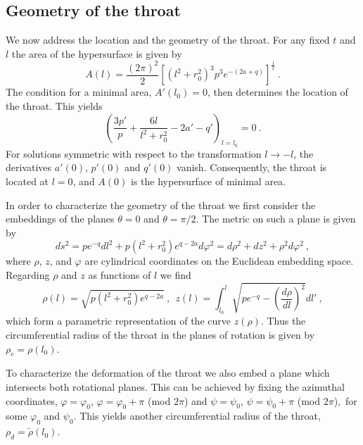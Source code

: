 \documentclass[showpacs,preprintnumbers,amsmath,amssymb,floatfix]{revtex4}
\newcommand{\vphi}{\varphi}
\begin{document}
\subsection{Geometry of the throat}

We now address the location and the geometry of the throat.
For any fixed $t$ and $l$ the area of the hypersurface is given by 
%
\begin{equation}
A(l) = \frac{(2\pi)^2}{2} 
     \left[(l^2+r_0^2)^3 p^3 e^{-(2a+q)}\right]^\frac{1}{2} \ .
\label{surface}
\end{equation}
%
The condition for a minimal area, $A'(l_0)=0$, then determines the location
of the throat. This yields
%
\begin{equation}
\left(\frac{3 p'}{p} + \frac{6l}{l^2+r_0^2} -2a' -q'\right)_{l=l_0} = 0 \ .
\label{cond_min}
\end{equation}
%
For solutions symmetric with respect to the transformation
$l \to -l$, the derivatives $a'(0)$, $p'(0)$ and $q'(0)$ vanish.
Consequently,  the throat is located at $l=0$,
and $A(0)$ is the hypersurface of minimal area.

In order to characterize the geometry of the throat we first
consider the embeddings of the planes %
$\theta=0$ and $\theta=\pi/2$.
The metric on such a plane is given by
%
\begin{equation}
ds^2 = p e^{-q} dl^2 + p(l^2+r_0^2) e^{q-2a}d\vphi^2
= d\rho^2 +dz^2 + \rho^2 d\vphi^2 \ ,
\label{embed1}
\end{equation}
%
where $\rho$, $z$, and $\vphi$ are cylindrical coordinates on the 
Euclidean embedding space. Regarding $\rho$ and $z$ as functions of 
$l$ we find 
%
\begin{equation}
\rho(l) = \sqrt{p(l^2+r_0^2) e^{q-2a}} \ ,  \ \ 
z(l) = \int_{l_0}^l{\sqrt{p e^{-q} - \left(\frac{d\rho}{dl}\right)^2}} dl' \ ,
\label{rho-z1}
\end{equation}
%
which form a parametric representation of the curve $z(\rho)$.
Thus the circumferential radius of the throat in the 
planes of rotation is given by $\rho_c= \rho(l_0)$.

To characterize the deformation of the throat we also
embed a plane which intersects both rotational planes. This can
be achieved by fixing the azimuthal coordinates, 
$\vphi = \vphi_0$, $\vphi = \vphi_0+\pi$ (mod $2\pi$)
and $\psi = \psi_0$, $\psi = \psi_0+\pi$ (mod $2\pi$),\
for some $\vphi_0$ and $\psi_0$.
This yields another circumferential radius of the throat,
$\rho_d= \tilde{\rho}(l_0)$.
\end{document}
